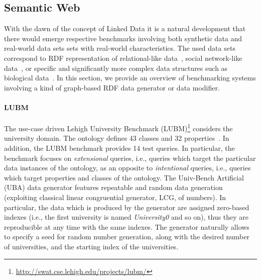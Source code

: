 \subsection{Semantic Web}
\label{sec:generators_LinkedData}
With the dawn of the concept of Linked Data it is a natural development that there would emerge respective benchmarks involving both synthetic data and real-world data sets  sets with real-world characteristics. The used data sets correspond to RDF representation of relational-like data~\cite{Guo2005158,Bizer09theberlin}, social network-like data~\cite{Schmidt2010}, or specific and significantly more complex data structures such as biological data~\cite{Wu2014}. In this section, we provide an overview of benchmarking systems involving a kind of graph-based RDF data generator or data modifier. %

\iffalse
Considering the Big Data world, the Linked Data in general definitely belong to this group since we assume that the Linked (Open) Data Sets form a common Linked Open Data cloud\footnote{\url{http://lod-cloud.net/}}. On the other hand, the particular data sets can be relatively small.
\fi

\paragraph{LUBM} The use-case driven Lehigh University Benchmark (LUBM)\footnote{\url{http://swat.cse.lehigh.edu/projects/lubm/}} considers the university domain. The ontology defines 43 classes and 32 properties~\cite{Guo2005158}. In addition, the LUBM benchmark provides 14 test queries. In particular, the benchmark focuses on \emph{extensional} queries, i.e., queries which target the particular data instances of the ontology, as an opposite to \emph{intentional} queries, i.e., queries which target properties and classes of the ontology. The Univ-Bench Artificial  (UBA) data generator features repeatable and random  data generation (exploiting classical linear congruential generator, LCG, of numbers). In particular, the data which is produced by the generator are assigned zero-based indexes (i.e., the first university is named \emph{University0} and so on), thus they are reproducible at any time with the same indexes.  The generator naturally allows to specify a seed for random number generation, along with the desired number of universities, and the starting index of the universities.

